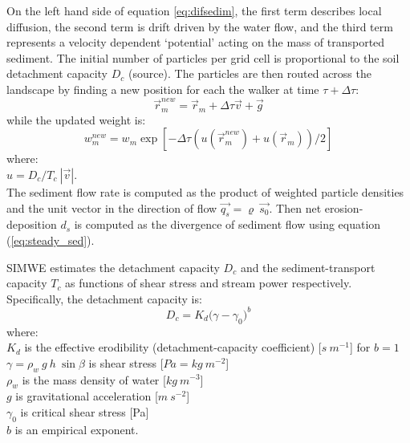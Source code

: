 \documentclass[gmd, manuscript]{copernicus}
\begin{document}
On the left hand side of equation \ref{eq:difsedim}, 
the first term describes local diffusion, 
the second term is drift driven by the water flow,
and the third term represents a velocity dependent `potential'
acting on the mass of transported sediment. 
The initial number of particles per grid cell 
is proportional to the soil detachment capacity $D_c$ (source).
The particles are then routed across the landscape
by finding a new position for each the walker at time $\tau + \Delta \tau$:
\begin{equation}
\vec{r}_m^{new}=\vec{r}_m + \Delta \tau \vec{v} + \vec{g}
\end{equation}
while the updated weight is:
\begin{equation}
w_m^{new}=w_m \exp[- \Delta \tau(u(\vec{r}_m^{new})+u(\vec{r}_m))/2]
\end{equation}
{\small
\noindent
where:\\
\noindent
\hspace*{0.5em} $u = {D_c / T_c}~|\vec{v}|$.\\
}
%
\noindent
The sediment flow rate is computed 
as the product of weighted particle densities 
and the unit vector in the direction of flow
$\vec{q_s} = \varrho~\vec{s_0}$.  %
Then net erosion-deposition $d_s$ 
is computed as the divergence of sediment flow using equation (\ref{eq:steady_sed}).

SIMWE estimates the detachment capacity $D_c $ and 
the sediment-transport capacity $T_c $ 
as functions of shear stress and stream power respectively. 
Specifically,  the detachment capacity is:
\begin{equation}
\label{eq:detach_cap}
D_c =K_d  \bigl(\gamma - \gamma_0 \bigr)^b  
\end{equation}
{\small
\noindent
where: \\
\noindent
\hspace*{0.5em} $K_d$ is the effective erodibility 
(detachment-capacity coefficient) [$\unit{s~m^{-1}}$] for $b=1$\\ %
\hspace*{0.5em} $\gamma=\rho_w~g~h~\sin \beta$ is shear stress [$\unit{Pa=kg~m^{-2}}$] \\
\hspace*{0.5em} $\rho_w$ is the mass density of water [$\unit{kg~m^{-3}}$] \\
\hspace*{0.5em} $g$ is gravitational acceleration [$\unit{m~s^{-2}}$]\\
\hspace*{0.5em} $\gamma_0$ is critical shear stress [Pa] \\
\hspace*{0.5em} $b$ is an empirical exponent.
}
\end{document}
